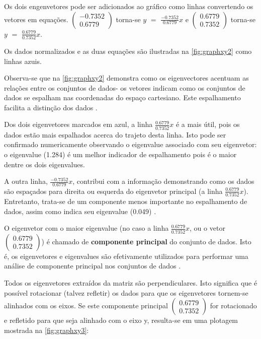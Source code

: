 Os dois engenvetores pode ser adicionados ao gráfico como linhas convertendo os vetores em equações. 
$\begin{pmatrix} -0.7352 \\ 0.6779 \end{pmatrix}$ torna-se $y$ $=$ $\frac{-0.7352}{0.6779}$$x$  e $\begin{pmatrix} 0.6779 \\ 0.7352 \end{pmatrix}$ torna-se $y$ $=$ $\frac{0.6779}{0.7352}$$x$.

Os dados normalizados e as duas equações são ilustradas na \autoref{fig:graphxy2} como linhas azuis. 

Observa-se que na \autoref{fig:graphxy2} demonstra como os eigenvectores acentuam as relações entre os conjuntos de dados- os vetores indicam como os conjuntos de dados se espalham nas coordenadas do espaço cartesiano. Este espalhamento facilita a distinção dos dados \cite{drmathew_java_programming}.

Dos dois eigenvetores marcados em azul, a linha $\frac{0.6779}{0.7352}$$x$ é a mais útil, pois os dados estão mais espalhados acerca do trajeto desta linha. Isto pode ser confirmado numericamente observando o eigenvalue associado com seu eigenvetor: o eigenvalue (1.284) é um melhor indicador de espalhamento pois é o maior dentre os dois eigenvalues.

A outra linha, $\frac{-0.7352}{0.6779}$$x$, contribui com a informação demonstrando como os dados são espaçados para direita ou esquerda do eigenvetor principal (a linha $\frac{0.6779}{0.7352}$$x$). Entretanto, trata-se de um componente menos importante no espalhamento de dados, assim como indica seu eigenvalue (0.049) \cite{drmathew_java_programming}.

O eigenvetor com o maior eigenvalue (no caso a linha $\frac{0.6779}{0.7352}$$x$, ou o vetor $\begin{pmatrix} 0.6779 \\ 0.7352 \end{pmatrix}$) é chamado de \textbf{componente principal} do conjunto de dados. Isto é, os eigenvetores e eigenvalues são efetivamente utilizados para performar uma análise de componente principal nos conjuntos de dados \cite{drmathew_java_programming}.

Todos os eigenvetores extraídos da matriz são perpendiculares. Isto significa que é possível rotacionar (talvez refletir) os dados para que os eigenvetores tornem-se alinhados com os eixos. Se este componente principal $\begin{pmatrix} 0.6779 \\ 0.7352 \end{pmatrix}$ for rotacionado e refletido para que seja alinhado com o eixo y, resulta-se em uma plotagem mostrada na \autoref{fig:graphxy3}:

